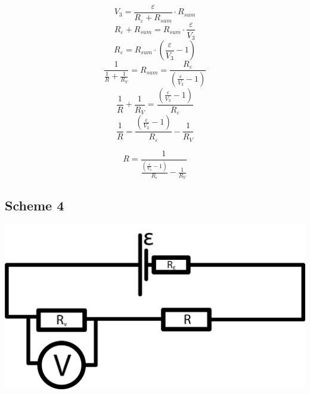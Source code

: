 \documentclass[11pt]{memoir}
\begin{document}
    \begin{equation*}
        V_3 = \frac{\varepsilon}{R_\varepsilon + R_{sum}} \cdot R_{sum}
    \end{equation*}
    \begin{equation*}
        R_\varepsilon + R_{sum} = R_{sum} \cdot \frac{\varepsilon}{V_3}
    \end{equation*}
    \begin{equation*}
        R_\varepsilon = R_{sum} \cdot \left(\frac{\varepsilon}{V_3} - 1 \right)
    \end{equation*}
    \begin{equation*}
        \frac{1}{\frac{1}{R} + \frac{1}{R_V}} = R_{sum} = \frac{R_\varepsilon}{\left(\frac{\varepsilon}{V_3} - 1 \right)}
    \end{equation*}
    \begin{equation*}
        \frac{1}{R} + \frac{1}{R_V} = \frac{\left(\frac{\varepsilon}{V_3} - 1 \right)}{R_\varepsilon}
    \end{equation*}
    \begin{equation*}
        \frac{1}{R} = \frac{\left(\frac{\varepsilon}{V_3} - 1 \right)}{R_\varepsilon} -  \frac{1}{R_V}
    \end{equation*}


    \begin{equation}\label{eq:equation3}
        R = \frac{1}{\frac{\left(\frac{\varepsilon}{V_3} - 1 \right)}{R_\varepsilon} -  \frac{1}{R_V}}
    \end{equation}

    \newpage

    \subsection{Scheme 4}\label{subsec:scheme-4}

    \includegraphics[width=\linewidth]{../schemes/Scheme4.png}
\end{document}
